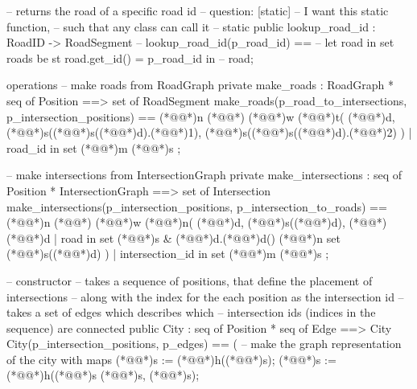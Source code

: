 \documentclass[a4paper]{article}
\begin{document}
\begin{vdm_al}
    -- returns the road of a specific road id
    -- question: [static]
    --           I want this static function,
    --           such that any class can call it
    -- static public lookup_road_id : RoadID -> RoadSegment
    -- lookup_road_id(p_road_id) ==
    --     let road in set roads be st road.get_id() = p_road_id in
    --         road;

operations
    -- make roads from RoadGraph
    private make_roads : RoadGraph * seq of Position ==> set of RoadSegment
    make_roads(p_road_to_intersections, p_intersection_positions) ==
        (*@@*)n (*@\vdmnotcovered{}@*){
            (*@@*)w (*@@*)t(
                (*@@*)d,
                (*@@*)s((*@@*)s((*@@*)d).(*@@*)1),
                (*@@*)s((*@@*)s((*@@*)d).(*@@*)2)
            )
            | road_id in set (*@@*)m (*@@*)s
        };
    
    -- make intersections from IntersectionGraph
    private make_intersections : seq of Position * IntersectionGraph ==> set of Intersection
    make_intersections(p_intersection_positions, p_intersection_to_roads) ==
        (*@@*)n (*@\vdmnotcovered{}@*){
            (*@@*)w (*@@*)n(
                (*@@*)d,
                (*@@*)s((*@@*)d),
                (*@\vdmnotcovered{}@*){
                    (*@@*)d
                    | road in set (*@@*)s & (*@@*)d.(*@@*)d() (*@@*)n set (*@@*)s((*@@*)d)
                }
            )
            | intersection_id in set (*@@*)m (*@@*)s
        };

    -- constructor
    -- takes a sequence of positions, that define the placement of intersections
    -- along with the index for the each position as the intersection id
    -- takes a set of edges which describes which
    -- intersection ids (indices in the sequence) are connected
    public City : seq of Position * seq of Edge ==> City
    City(p_intersection_positions, p_edges) == (
        -- make the graph representation of the city with maps
        (*@@*)s := (*@@*)h((*@@*)s);
        (*@@*)s := (*@@*)h((*@@*)s (*@@*)s, (*@@*)s);
        

\end{vdm_al}
\end{document}
